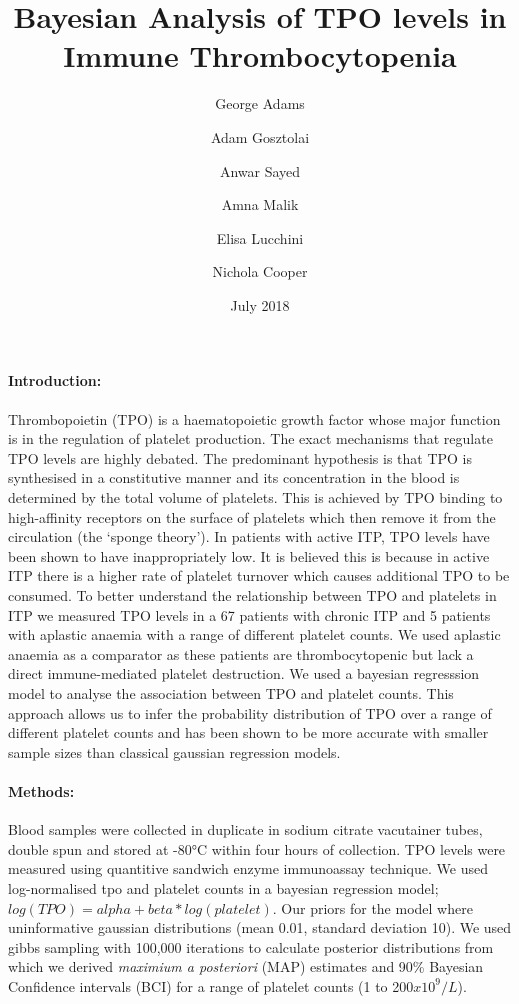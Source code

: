 \documentclass[11pt]{article}
\title{Bayesian Analysis of TPO levels in Immune Thrombocytopenia}
\author[1,2]{\small George Adams}
\author[1]{\small Adam Gosztolai}
\author[1]{\small Anwar Sayed}
\author[1]{\small Amna Malik}
\author[1]{\small Elisa Lucchini}
\author[1,2]{\small Nichola Cooper}
\affil[1]{\footnotesize Imperial College London, Kensington, London SW7 2AZ}
\affil[2]{\footnotesize Hammersmith Hospital, Imperial College NHS Trust, London W12 0HS}
\date{July 2018}
\begin{document}
\maketitle

\paragraph{Introduction:} Thrombopoietin (TPO) is a haematopoietic growth factor whose major function is in the regulation of platelet production. The exact mechanisms that regulate TPO levels are highly debated. The predominant hypothesis is that TPO is synthesised in a constitutive manner and its concentration in the blood is determined by the total volume of platelets. This is achieved by TPO binding to high-affinity receptors on the surface of platelets which then remove it from the circulation (the `sponge theory'). %
In patients with active ITP, TPO levels have been shown to have inappropriately low. It is believed this is because in active ITP there is a higher rate of platelet turnover which causes additional TPO to be consumed. To better understand the relationship between TPO and platelets in ITP we measured TPO levels in a 67 patients with chronic ITP and 5 patients with aplastic anaemia with a range of different platelet counts. We used aplastic anaemia as a comparator as these patients are thrombocytopenic but lack a direct immune-mediated platelet destruction. We used a bayesian regresssion model to analyse the association between TPO and platelet counts. This approach allows us to infer the probability distribution of TPO over a range of different platelet counts and has been shown to be more accurate with smaller sample sizes than classical gaussian regression models. %


\paragraph{Methods:} Blood samples were collected in duplicate in sodium citrate vacutainer tubes, double spun and stored at -80°C within four hours of collection. TPO levels were measured using quantitive sandwich enzyme immunoassay technique. We used log-normalised tpo and platelet counts in a bayesian regression model; $log(TPO) = alpha + beta*log(platelet)$. Our priors for the model where uninformative gaussian distributions (mean 0.01, standard deviation 10). We used gibbs sampling with 100,000 iterations to calculate posterior distributions from which we derived \textit{maximium a posteriori} (MAP) estimates and 90\% Bayesian Confidence intervals (BCI) for a range of platelet counts (1 to 200$x10^9/L$).
\end{document}
